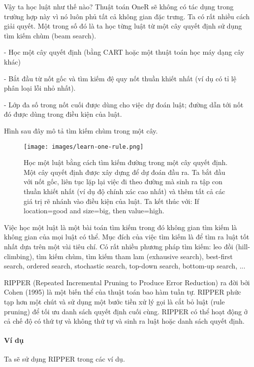 Vậy ta học luật như thế nào? Thuật toán OneR sẽ không có tác dụng trong trường hợp này vì nó luôn phủ tất cả không gian đặc trưng. Ta có rất nhiều cách giải quyết. Một trong số đó là ta học từng luật từ một cây quyết định sử dụng tìm kiếm chùm (beam search).

- Học một cây quyết định (bằng CART hoặc một thuật toán học máy dạng cây khác)

- Bắt đầu từ nốt gốc và tìm kiếm đệ quy nốt thuần khiết nhất (ví dụ có tỉ lệ phân loại lỗi nhỏ nhất).

- Lớp đa số trong nốt cuối được dùng cho việc dự đoán luật; đường dẫn tới nốt đó được dùng trong điều kiện của luật.

Hình sau đây mô tả tìm kiếm chùm trong một cây.

\begin{figure*}[h!]
	\centering
	\texttt{[image: images/learn-one-rule.png]}
	\label{fig:4_20}
	\caption{Học một luật bằng cách tìm kiếm đường trong một cây quyết định. Một cây quyết định được xây dựng để dự đoán đầu ra. Ta bắt đầu với nốt gốc, liên tục lặp lại việc đi theo đường mà sinh ra tập con thuần khiết nhất (ví dụ độ chính xác cao nhất) và thêm tất cả các giá trị rẽ nhánh vào điều kiện của luật. Ta kết thúc với: If location=good and size=big, then value=high.}
	
\end{figure*}

Việc học một luật là một bài toán tìm kiếm trong đó không gian tìm kiếm là không gian của mọi luật có thể. Mục đích của việc tìm kiếm là để tìm ra luật tốt nhất dựa trên một vài tiêu chí. Có rất nhiều phương pháp tìm kiếm: leo đồi (hill-climbing), tìm kiếm chùm, tìm kiếm tham lam (exhausive search),  best-first search, ordered search, stochastic search, top-down search, bottom-up search, ...

RIPPER (Repeated Incremental Pruning to Produce Error Reduction) ra đời bởi Cohen (1995) là một biến thể của thuật toán bao hàm tuần tự. RIPPER phức tạp hơn một chút và sử dụng một bước tiền xử lý gọi là cắt bỏ luật (rule pruning) để tối ưu danh sách quyết định cuối cùng. RIPPER có thể hoạt động ở cả chế độ có thứ tự và không thứ tự và sinh ra luật hoặc danh sách quyết định.

\paragraph{Ví dụ}

Ta sẽ sử dụng RIPPER trong các ví dụ.

